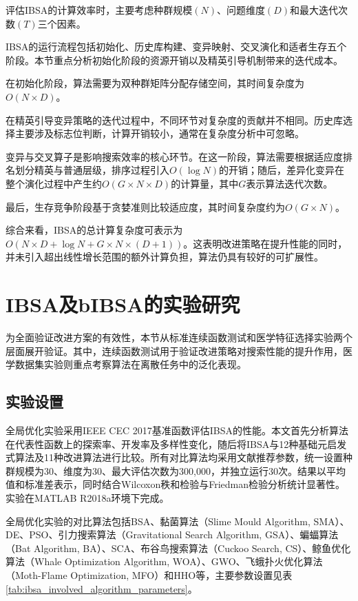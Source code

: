 评估IBSA的计算效率时，主要考虑种群规模$(N)$、问题维度$(D)$和最大迭代次数$(T)$三个因素。

IBSA的运行流程包括初始化、历史库构建、变异映射、交叉演化和适者生存五个阶段。本节重点分析初始化阶段的资源开销以及精英引导机制带来的迭代成本。

在初始化阶段，算法需要为双种群矩阵分配存储空间，其时间复杂度为$O(N \times D)$。

在精英引导变异策略的迭代过程中，不同环节对复杂度的贡献并不相同。历史库选择主要涉及标志位判断，计算开销较小，通常在复杂度分析中可忽略。

变异与交叉算子是影响搜索效率的核心环节。在这一阶段，算法需要根据适应度排名划分精英与普通层级，排序过程引入$O(\log N)$的开销；随后，差异化变异在整个演化过程中产生约$O(G \times N \times D)$的计算量，其中$G$表示算法迭代次数。

最后，生存竞争阶段基于贪婪准则比较适应度，其时间复杂度约为$O(G \times N)$。

综合来看，IBSA的总计算复杂度可表示为$O(N \times D + \log N + G \times N \times (D+1))$。这表明改进策略在提升性能的同时，并未引入超出线性增长范围的额外计算负担，算法仍具有较好的可扩展性。


\section{IBSA及bIBSA的实验研究}

为全面验证改进方案的有效性，本节从标准连续函数测试和医学特征选择实验两个层面展开验证。其中，连续函数测试用于验证改进策略对搜索性能的提升作用，医学数据集实验则重点考察算法在离散任务中的泛化表现。

\subsection{实验设置}

全局优化实验采用IEEE CEC 2017基准函数评估IBSA的性能。本文首先分析算法在代表性函数上的探索率、开发率及多样性变化，随后将IBSA与12种基础元启发式算法及11种改进算法进行比较。所有对比算法均采用文献推荐参数，统一设置种群规模为30、维度为30、最大评估次数为300,000，并独立运行30次。结果以平均值和标准差表示，同时结合Wilcoxon秩和检验与Friedman检验分析统计显著性。实验在MATLAB R2018a环境下完成。

全局优化实验的对比算法包括BSA、黏菌算法（Slime Mould Algorithm, SMA）、DE、PSO、引力搜索算法（Gravitational Search Algorithm, GSA）、蝙蝠算法（Bat Algorithm, BA）、SCA、布谷鸟搜索算法（Cuckoo Search, CS）、鲸鱼优化算法（Whale Optimization Algorithm, WOA）、GWO、飞蛾扑火优化算法（Moth-Flame Optimization, MFO）和HHO等，主要参数设置见表\ref{tab:ibsa_involved_algorithm_parameters}。

